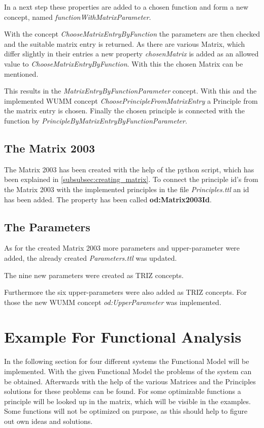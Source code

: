 \documentclass[11pt,a4paper]{article}
\begin{document}
In a next step these properties are added to a chosen function and form a new
concept, named \emph{functionWithMatrixParameter}.

With the concept \emph{ChooseMatrixEntryByFunction} the parameters are then
checked and the suitable matrix entry is returned.  As there are various
Matrix, which differ slightly in their entries a new property
\emph{chosenMatrix} is added as an allowed value to
\emph{ChooseMatrixEntryByFunction}.  With this the chosen Matrix can be
mentioned.

This results in the \emph{MatrixEntryByFunctionParameter} concept.  With this
and the implemented WUMM concept \emph{ChoosePrincipleFromMatrixEntry} a
Principle from the matrix entry is chosen.  Finally the chosen principle is
connected with the function by
\emph{PrincipleByMatrixEntryByFunctionParameter}.

\subsection{The Matrix 2003}

The Matrix 2003 has been created with the help of the python script, which has
been explained in \ref{subsubsec:creating_matrix}.  To connect the principle
id's from the Matrix 2003 with the implemented principles in the file
\emph{Principles.ttl} an id has been added.  The property has been called
\textbf{od:Matrix2003Id}.

\subsection{The Parameters}

As for the created Matrix 2003 more parameters and upper-parameter were added,
the already created \emph{Parameters.ttl} was updated.

The nine new parameters were created as TRIZ concepts.

Furthermore the six upper-parameters were also added as TRIZ concepts.  For
those the new WUMM concept \emph{od:UpperParameter} was implemented.


\section{Example For Functional Analysis}
\label{sec:examples}

In the following section for four different systems the Functional Model will
be implemented.  With the given Functional Model the problems of the system
can be obtained.  Afterwards with the help of the various Matrices and the
Principles solutions for these problems can be found.  For some optimizable
functions a principle will be looked up in the matrix, which will be visible
in the examples.  Some functions will not be optimized on purpose, as this
should help to figure out own ideas and solutions.
\end{document}
